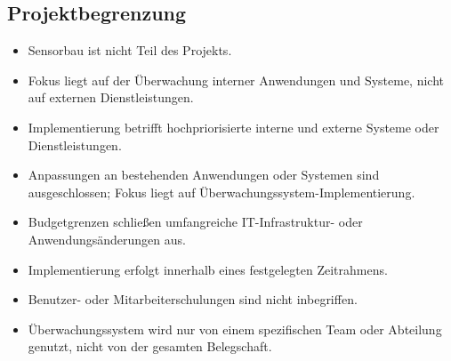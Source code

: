 \begin{flushleft}
\subsection{Projektbegrenzung}
\begin{itemize}
\item Sensorbau ist nicht Teil des Projekts.
\item Fokus liegt auf der Überwachung interner Anwendungen und Systeme, nicht auf externen Dienstleistungen.
\item Implementierung betrifft hochpriorisierte interne und externe Systeme oder Dienstleistungen.
\item Anpassungen an bestehenden Anwendungen oder Systemen sind ausgeschlossen; Fokus liegt auf Überwachungssystem-Implementierung.
\item Budgetgrenzen schließen umfangreiche IT-Infrastruktur- oder Anwendungsänderungen aus.
\item Implementierung erfolgt innerhalb eines festgelegten Zeitrahmens.
\item Benutzer- oder Mitarbeiterschulungen sind nicht inbegriffen.
\item Überwachungssystem wird nur von einem spezifischen Team oder Abteilung genutzt, nicht von der gesamten Belegschaft.
\end{itemize}



\end{flushleft}
